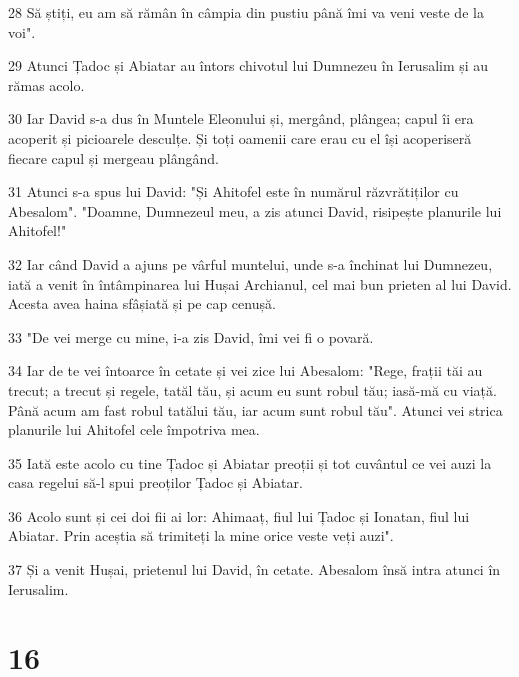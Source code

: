 \par 28 Să știți, eu am să rămân în câmpia din pustiu până îmi va veni veste de la voi".
\par 29 Atunci Țadoc și Abiatar au întors chivotul lui Dumnezeu în Ierusalim și au rămas acolo.
\par 30 Iar David s-a dus în Muntele Eleonului și, mergând, plângea; capul îi era acoperit și picioarele desculțe. Și toți oamenii care erau cu el își acoperiseră fiecare capul și mergeau plângând.
\par 31 Atunci s-a spus lui David: "Și Ahitofel este în numărul răzvrătiților cu Abesalom". "Doamne, Dumnezeul meu, a zis atunci David, risipește planurile lui Ahitofel!"
\par 32 Iar când David a ajuns pe vârful muntelui, unde s-a închinat lui Dumnezeu, iată a venit în întâmpinarea lui Hușai Archianul, cel mai bun prieten al lui David. Acesta avea haina sfâșiată și pe cap cenușă.
\par 33 "De vei merge cu mine, i-a zis David, îmi vei fi o povară.
\par 34 Iar de te vei întoarce în cetate și vei zice lui Abesalom: "Rege, frații tăi au trecut; a trecut și regele, tatăl tău, și acum eu sunt robul tău; iasă-mă cu viață. Până acum am fast robul tatălui tău, iar acum sunt robul tău". Atunci vei strica planurile lui Ahitofel cele împotriva mea.
\par 35 Iată este acolo cu tine Țadoc și Abiatar preoții și tot cuvântul ce vei auzi la casa regelui să-l spui preoților Țadoc și Abiatar.
\par 36 Acolo sunt și cei doi fii ai lor: Ahimaaț, fiul lui Țadoc și Ionatan, fiul lui Abiatar. Prin aceștia să trimiteți la mine orice veste veți auzi".
\par 37 Și a venit Hușai, prietenul lui David, în cetate. Abesalom însă intra atunci în Ierusalim.

\chapter{16}

